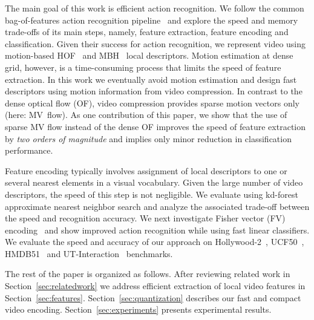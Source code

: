 \documentclass[10pt,twocolumn,letterpaper]{article}
\begin{document}
The main goal of this work is efficient action recognition. We
follow the common bag-of-features action recognition
pipeline~\cite{Laptev08,Schuldt04,Wang12} and explore the speed
and memory trade-offs of its main steps, namely, feature
extraction, feature encoding and classification. Given their success for action recognition, we represent video
using motion-based HOF~\cite{Laptev08} and MBH~\cite{Wang12}
local descriptors. Motion estimation at dense grid, however, is a time-consuming process that
limits the speed of feature extraction.
In this work we eventually avoid motion estimation and design fast
descriptors using motion information from video compression.
In contrast to the dense optical flow (OF), video compression
provides sparse motion vectors only (here: MV~flow).
As one contribution of this paper, we show that the use of
sparse MV flow instead of the dense OF improves the speed of
feature extraction by {\em two orders of magnitude} and implies
only minor reduction in classification performance.

Feature encoding typically involves assignment of local
descriptors to one or several nearest elements in a visual
vocabulary. Given the large number of video descriptors, the
speed of this step is not negligible. We evaluate using kd-forest approximate nearest neighbor search \cite{Philbin07} and analyze the associated trade-off between the speed and
recognition accuracy. We next investigate Fisher vector (FV)
encoding~\cite{Perronnin12} and show improved action recognition
while using fast linear classifiers.
We evaluate the speed and accuracy of our approach on
\mbox{Hollywood-2}~\cite{Marszalek09}, UCF50~\cite{Reddy12}, HMDB51~\cite{Kuehne11} and UT-Interaction~\cite{Ryoo10} benchmarks.

The rest of the paper is organized as follows. 
After reviewing related work in Section~\ref{sec:relatedwork} we
address efficient extraction of local video features in
Section~\ref{sec:features}. Section~\ref{sec:quantization}
describes our fast and compact video encoding.
Section~\ref{sec:experiments} presents experimental results.
\end{document}
